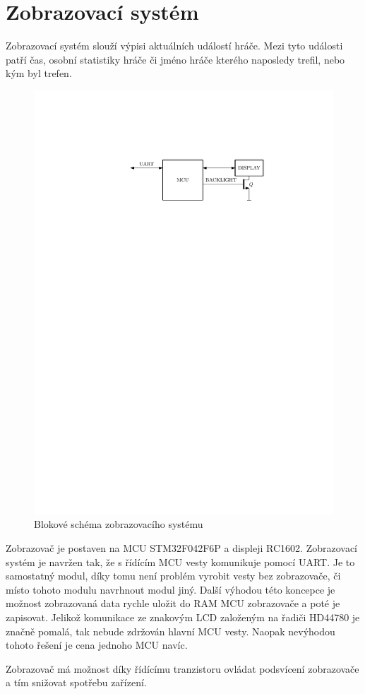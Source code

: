 \chapter{Zobrazovací systém}

Zobrazovací systém slouží výpisi aktuálních událostí hráče. Mezi tyto události patří čas, osobní statistiky hráče či jméno hráče kterého naposledy trefil, nebo kým byl trefen.

\begin{figure}[H]
    \begin{center}
        \includegraphics[width=\textwidth]{img/display}
    \end{center}
    \caption{Blokové schéma zobrazovacího systému}
\end{figure}

Zobrazovač je postaven na MCU STM32F042F6P a displeji RC1602. Zobrazovací systém je navržen tak, že s řídícím MCU vesty komunikuje pomocí UART. Je to samostatný modul, díky tomu není problém vyrobit vesty bez zobrazovače, či místo tohoto modulu navrhnout modul jiný. Další výhodou této koncepce je možnost zobrazovaná data rychle uložit do RAM MCU zobrazovače a poté je zapisovat. Jelikož komunikace ze znakovým LCD založeným na řadiči HD44780 je značně pomalá, tak nebude zdržován hlavní MCU vesty. Naopak nevýhodou tohoto řešení je cena jednoho MCU navíc.

Zobrazovač má možnost díky řídícímu tranzistoru ovládat podsvícení zobrazovače a tím snižovat spotřebu zařízení.
